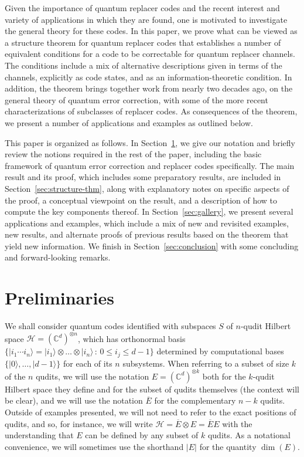 \documentclass[11pt]{amsart}
\theoremstyle{definition}
\theoremstyle{definition}
\theoremstyle{definition}
\newcommand{\1}{\mathbb{I}}
\def\ket#1{| #1 \rangle}
\begin{document}
Given the importance of quantum replacer codes and the recent interest and variety of applications in which they are found, one is motivated to investigate the general theory for these codes.
In this paper, we prove what can be viewed as a structure theorem for quantum replacer codes that establishes a number of equivalent conditions for a code to be correctable for quantum replacer channels.
The conditions include a mix of alternative descriptions given in terms of the channels, explicitly as code states, and as an information-theoretic condition.
In addition, the theorem brings together work from nearly two decades ago, on the general theory of quantum error correction, with some of the more recent characterizations of subclasses of replacer codes.
As consequences of the theorem, we present a number of applications and examples as outlined below. 

This paper is organized as follows.
In Section~\ref{sec:preliminaries}, we give our notation and briefly review the notions required in the rest of the paper, including the basic framework of quantum error correction and replacer codes specifically.
The main result and its proof, which includes some preparatory results, are included in Section~\ref{sec:structure-thm}, along with explanatory notes on specific aspects of the proof, a conceptual viewpoint on the result, and a description of how to compute the key components thereof.
In Section~\ref{sec:gallery}, we present several applications and examples, which include a mix of new and revisited examples, new results, and alternate proofs of previous results based on the theorem that yield new information.
We finish in Section~\ref{sec:conclusion} with some concluding and forward-looking remarks.   



\section{Preliminaries}\label{sec:preliminaries}

We shall consider quantum codes identified with subspaces $S$ of $n$-qudit Hilbert space $\mathcal H = (\mathbb{C}^d)^{\otimes n}$, which has orthonormal basis $\{ \ket{i_1 \cdots i_n} = \ket{i_1} \otimes \ldots \otimes \ket{i_n}  \, : \, 0 \leq i_j \leq d-1 \}$ determined by computational bases $\{ \ket{0}, \ldots , \ket{d-1} \}$ for each of its $n$ subsystems. When referring to a subset of size $k$ of the $n$ qudits, we will use the notation $E = (\mathbb{C}^d)^{\otimes k}$ both for the $k$-qudit Hilbert space they define and for the subset of qudits themselves (the context will be clear), and we will use the notation $\overline{E}$ for the complementary $n-k$ qudits. Outside of examples presented, we will not need to refer to the exact positions of qudits, and so, for instance, we will write $\mathcal H = \overline{E} \otimes E = \overline{E} E$ with the understanding that $E$ can be defined by any subset of $k$ qudits. As a notational convenience, we will sometimes use the shorthand $|E|$ for the quantity $\dim (E)$. 
\end{document}
